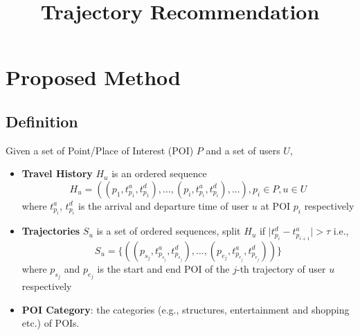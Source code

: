 \documentclass{sig-alternate-05-2015}
\begin{document}

\title{Trajectory Recommendation}


\maketitle




\section{Proposed Method}


\subsection{Definition}
Given a set of Point/Place of Interest (POI) $P$ and a set of users $U$,
\begin{itemize}
\item \textbf{Travel History} $H_u$\cite{ijcai15} is an ordered sequence
      \begin{displaymath}
      H_u = ((p_1, t_{p_1}^a, t_{p_1}^d), \dots, (p_i, t_{p_i}^a, t_{p_i}^d), \dots), p_i \in P, u \in U
      \end{displaymath}
      where $t_{p_i}^a$, $t_{p_i}^d$ is the arrival and departure time of user $u$ at POI $p_i$ respectively
\item \textbf{Trajectories} $S_u$ is a set of ordered sequences, split $H_u$ if
      $\lvert t_{p_i}^d - t_{p_{i+1}}^a \rvert > \tau$\cite{ijcai15}
      i.e.,
      \begin{displaymath}
      S_u = \{((p_{s_j}, t_{p_{s_j}}^a, t_{p_{s_j}}^d), \dots, (p_{e_j}, t_{p_{e_j}}^a, t_{p_{e_j}}^d))\}
      \end{displaymath}
      where $p_{s_j}$ and $p_{e_j}$ is the start and end POI of the $j$-th trajectory of user $u$ respectively
\item \textbf{POI Category}: the categories (e.g., structures, entertainment and shopping etc.) of POIs.
\end{itemize}
\end{document}
